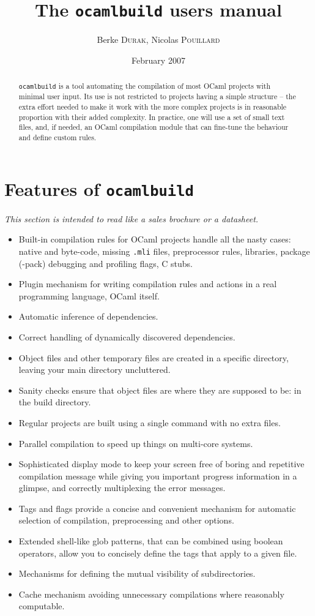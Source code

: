 \documentclass[9pt]{article}
\newcommand{\ocb}{\texttt{ocamlbuild}\xspace}
\begin{document}
\title{The \ocb users manual}
\author{Berke \textsc{Durak}, Nicolas \textsc{Pouillard}}
\date{February 2007}
\maketitle
\begin{abstract}
\ocb is a tool automating the compilation of most OCaml projects with minimal
user input.  Its use is not restricted to projects having a simple structure --
the extra effort needed to make it work with the more complex projects is in
reasonable proportion with their added complexity.  In practice, one will use a
set of small text files, and, if needed, an OCaml compilation module that can
fine-tune the behaviour and define custom rules.
\end{abstract}
\section{Features of \ocb}
{\em This section is intended to read like a sales brochure or a datasheet.}

\begin{itemize}
\item Built-in compilation rules for OCaml projects handle all the nasty cases:
native and byte-code, missing \texttt{.mli} files, preprocessor rules,
libraries, package (-pack) debugging and profiling flags, C stubs.
\item Plugin mechanism for writing compilation rules and actions in a real programming language,
OCaml itself.
\item Automatic inference of dependencies.
\item Correct handling of dynamically discovered dependencies.
\item Object files and other temporary files are created in a specific directory, leaving your main directory uncluttered.  
\item Sanity checks ensure that object files are where they are supposed to be: in the build directory.
\item Regular projects are built using a single command with no extra files.
\item Parallel compilation to speed up things on multi-core systems.
\item Sophisticated display mode to keep your screen free of boring and repetitive compilation message
while giving you important progress information in a glimpse, and correctly multiplexing the error messages.
\item Tags and flags provide a concise and convenient mechanism for automatic selection of compilation, preprocessing and
other options.
\item Extended shell-like glob patterns, that can be combined using boolean operators,
allow you to concisely define the tags that apply to a given file.
\item Mechanisms for defining the mutual visibility of subdirectories.
\item Cache mechanism avoiding unnecessary compilations where reasonably computable.
\end{itemize}
\end{document}
